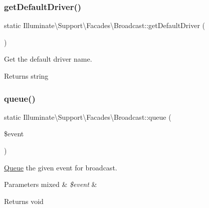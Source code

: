 \subsubsection{\texorpdfstring{get\+Default\+Driver()}{getDefaultDriver()}}
{\footnotesize\ttfamily static Illuminate\textbackslash{}\+Support\textbackslash{}\+Facades\textbackslash{}\+Broadcast\+::get\+Default\+Driver (\begin{DoxyParamCaption}{ }\end{DoxyParamCaption})\hspace{0.3cm}{\ttfamily [static]}}

Get the default driver name.

\begin{DoxyReturn}{Returns}
string 
\end{DoxyReturn}
\mbox{\label{class_illuminate_1_1_support_1_1_facades_1_1_broadcast_a25f11be8ae7dd784f6b7f0930fcb8ef1}} 
\subsubsection{\texorpdfstring{queue()}{queue()}}
{\footnotesize\ttfamily static Illuminate\textbackslash{}\+Support\textbackslash{}\+Facades\textbackslash{}\+Broadcast\+::queue (\begin{DoxyParamCaption}\item[{}]{\$event }\end{DoxyParamCaption})\hspace{0.3cm}{\ttfamily [static]}}

\mbox{\hyperlink{class_illuminate_1_1_support_1_1_facades_1_1_queue}{Queue}} the given event for broadcast.


\begin{DoxyParams}[1]{Parameters}
mixed & {\em \$event} & \\
\hline
\end{DoxyParams}
\begin{DoxyReturn}{Returns}
void 
\end{DoxyReturn}
\mbox{\label{class_illuminate_1_1_support_1_1_facades_1_1_broadcast_a7b01f8f6feddd98350be0def6f2ec6fd}} 
